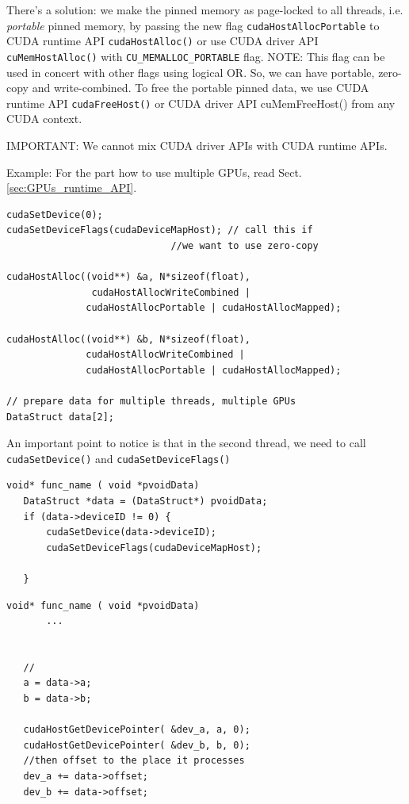 There's a solution: we make the pinned memory as page-locked to all threads,
i.e. {\it portable} pinned memory, by passing the new flag
\verb!cudaHostAllocPortable! to CUDA runtime API \verb!cudaHostAlloc()! or use
CUDA driver API \verb!cuMemHostAlloc()! with \verb!CU_MEMALLOC_PORTABLE! flag.
NOTE: This flag can be used in concert with other flags using logical OR. So, we
can have portable, zero-copy and write-combined. To free the portable pinned
data, we use CUDA runtime API \verb!cudaFreeHost()! or CUDA driver API
cuMemFreeHost() from any CUDA context.


IMPORTANT: We cannot mix CUDA driver APIs with CUDA runtime APIs.


Example: For the part how to use multiple GPUs, read
Sect.\ref{sec:GPUs_runtime_API}.
\begin{lstlisting}
cudaSetDevice(0);
cudaSetDeviceFlags(cudaDeviceMapHost); // call this if 
                             //we want to use zero-copy

cudaHostAlloc((void**) &a, N*sizeof(float), 
               cudaHostAllocWriteCombined |
              cudaHostAllocPortable | cudaHostAllocMapped);

cudaHostAlloc((void**) &b, N*sizeof(float), 
              cudaHostAllocWriteCombined |
              cudaHostAllocPortable | cudaHostAllocMapped);

// prepare data for multiple threads, multiple GPUs
DataStruct data[2];
\end{lstlisting}

An important point to notice is that in the second thread, we need to call
\verb!cudaSetDevice()! and \verb!cudaSetDeviceFlags()!
\begin{lstlisting}
void* func_name ( void *pvoidData) 
   DataStruct *data = (DataStruct*) pvoidData;
   if (data->deviceID != 0) {
       cudaSetDevice(data->deviceID);
       cudaSetDeviceFlags(cudaDeviceMapHost);
       
   }
\end{lstlisting}

\begin{lstlisting}
void* func_name ( void *pvoidData) 
       ...
       
       
   //
   a = data->a;
   b = data->b;
   
   cudaHostGetDevicePointer( &dev_a, a, 0);
   cudaHostGetDevicePointer( &dev_b, b, 0);
   //then offset to the place it processes
   dev_a += data->offset;
   dev_b += data->offset;
\end{lstlisting}

